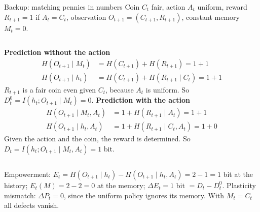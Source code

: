 \documentclass[11pt,aspectratio=169]{beamer}
\newcommand{\dE}{\Delta E}
\newcommand{\dP}{\Delta P}
\begin{document}
\begin{frame}{Backup: matching pennies in numbers}
Coin $C_t$ fair, action $A_t$ uniform, reward $R_{t+1} = 1$ if $A_t = C_t$, observation $O_{t+1} = (C_{t+1}, R_{t+1})$, constant memory $M_t = 0$.
\vspace{2mm}
\begin{columns}[T]\small
{}
\textbf{Prediction without the action}
\begin{align*}
H(O_{t+1} \mid M_t) &= H(C_{t+1}) + H(R_{t+1}) = 1 + 1 \\
H(O_{t+1} \mid h_t) &= H(C_{t+1}) + H(R_{t+1} \mid C_t) = 1 + 1
\end{align*}
$R_{t+1}$ is a fair coin even given $C_t$, because $A_t$ is uniform. So $D^0_t = I(h_t; O_{t+1} \mid M_t) = 0$.
\textbf{Prediction with the action}
\begin{align*}
H(O_{t+1} \mid M_t, A_t) &= 1 + H(R_{t+1} \mid A_t) = 1 + 1 \\
H(O_{t+1} \mid h_t, A_t) &= 1 + H(R_{t+1} \mid C_t, A_t) = 1 + 0
\end{align*}
Given the action and the coin, the reward is determined. So $D_t = I(h_t; O_{t+1} \mid M_t, A_t) = 1$ bit.
\end{columns}
\vspace{3mm}
Empowerment: $E_t = H(O_{t+1} \mid h_t) - H(O_{t+1} \mid h_t, A_t) = 2 - 1 = 1$ bit at the history; $E_t(M) = 2 - 2 = 0$ at the memory; $\dE_t = 1$ bit $= D_t - D^0_t$. Plasticity mismatch: $\dP_t = 0$, since the uniform policy ignores its memory. With $M_t = C_t$ all defects vanish.
\end{frame}
\end{document}
